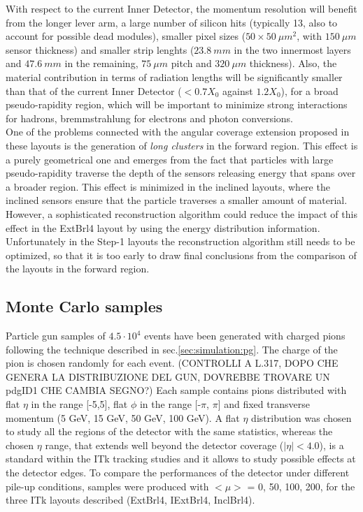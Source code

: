 \documentclass[a4paper,twoside,12pt]{article}
\begin{document}
With respect to the current Inner Detector, the momentum resolution will benefit from the longer lever arm, a large number of silicon hits (typically 13, also to account for
possible dead modules), smaller pixel sizes ($50 \times 50\ \mu m^2$, with $150\ \mu m$ sensor thickness) and smaller strip lenghts ($23.8\ mm$ in the two innermost
layers and $47.6\ mm$ in the remaining, $75\ \mu m$ pitch and $320\ \mu m$ thickness)\cite{scoping}. Also, the material contribution in terms of radiation lengths 
will be significantly smaller than that of the current Inner Detector ($< 0.7 X_{0}$ against $1.2 X_{0}$), for a broad pseudo-rapidity region, which will be important to minimize
strong interactions for hadrons, bremmstrahlung for electrons and photon conversions. \\

One of the problems connected with the angular coverage extension proposed in these layouts is the generation of \textit{long clusters} in the forward region. This effect is a purely 
geometrical one and emerges from the fact that particles with large pseudo-rapidity traverse the depth of the sensors releasing energy that spans over a broader region. This effect is
minimized in the inclined layouts, where the inclined sensors ensure that the particle traverses a smaller amount of material. However, a sophisticated reconstruction algorithm could reduce
the impact of this effect in the ExtBrl4 layout by using the energy distribution information. Unfortunately in the Step-1 layouts the reconstruction algorithm still needs to be optimized,
so that it is too early to draw final conclusions from the comparison of the layouts in the forward region. \\

\subsection{Monte Carlo samples}\label{sec:tracking:sampleProduction}
Particle gun samples of $4.5\cdot 10^4$ events have been generated with charged pions following the technique described in sec.\ref{sec:simulation:pg}. The charge of the pion
is chosen randomly for each event. (CONTROLLI A L.317, DOPO CHE GENERA LA DISTRIBUZIONE DEL GUN, DOVREBBE TROVARE UN pdgID1 CHE CAMBIA SEGNO?)
Each sample contains pions distributed with flat $\eta$ in the range [-5,5], flat $\phi$ in the range [-$\pi$, $\pi$] and fixed transverse momentum (5 GeV, 15 GeV, 50 GeV, 100 GeV). 
A flat $\eta$ distribution was chosen to study all the regions of the detector with the same statistics, whereas the chosen $\eta$ range, that extends well beyond the detector coverage ($|\eta| < 4.0$),
is a standard within the ITk tracking studies and it allows to study possible effects at the detector edges. 
To compare the performances of the detector under different pile-up conditions, samples were produced with $<\mu>$ = 0, 50, 100, 200, for the three ITk layouts described (ExtBrl4,
IExtBrl4, InclBrl4).
\end{document}
